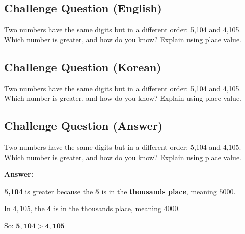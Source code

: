 \cleardoublepage
\subsection*{Challenge Question (English)}
Two numbers have the same digits but in a different order: 5,104 and 4,105. Which number is greater, and how do you know? Explain using place value.


\newpage
\subsection*{Challenge Question (Korean)}
Two numbers have the same digits but in a different order: 5,104 and 4,105. Which number is greater, and how do you know? Explain using place value.


\newpage
\subsection*{Challenge Question (Answer)}
Two numbers have the same digits but in a different order: 5,104 and 4,105. Which number is greater, and how do you know? Explain using place value.

\textbf{Answer:}

\textbf{5{,}104} is greater because the \textbf{5} is in the \textbf{thousands place}, meaning $5000$.

In $4{,}105$, the \textbf{4} is in the thousands place, meaning $4000$.

So: $\mathbf{5{,}104 > 4{,}105}$